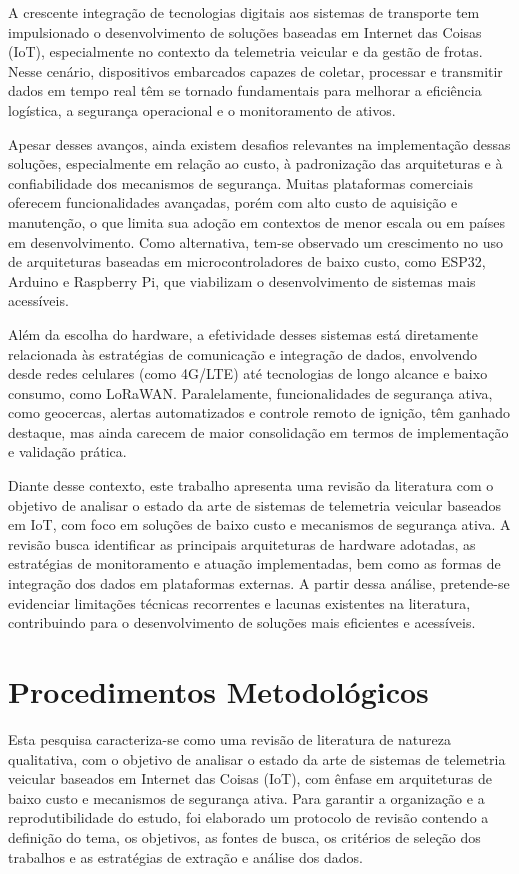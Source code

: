 \documentclass[
	article,			%
	11pt,				%
	oneside,			%
	a4paper,			%
	english,			%
	brazil,				%
	sumario=tradicional
	]{abntex2}
\begin{document}
A crescente integração de tecnologias digitais aos sistemas de transporte tem impulsionado o desenvolvimento de soluções baseadas em Internet das Coisas (IoT), especialmente no contexto da telemetria veicular e da gestão de frotas. Nesse cenário, dispositivos embarcados capazes de coletar, processar e transmitir dados em tempo real têm se tornado fundamentais para melhorar a eficiência logística, a segurança operacional e o monitoramento de ativos.

Apesar desses avanços, ainda existem desafios relevantes na implementação dessas soluções, especialmente em relação ao custo, à padronização das arquiteturas e à confiabilidade dos mecanismos de segurança. Muitas plataformas comerciais oferecem funcionalidades avançadas, porém com alto custo de aquisição e manutenção, o que limita sua adoção em contextos de menor escala ou em países em desenvolvimento. Como alternativa, tem-se observado um crescimento no uso de arquiteturas baseadas em microcontroladores de baixo custo, como ESP32, Arduino e Raspberry Pi, que viabilizam o desenvolvimento de sistemas mais acessíveis.

Além da escolha do hardware, a efetividade desses sistemas está diretamente relacionada às estratégias de comunicação e integração de dados, envolvendo desde redes celulares (como 4G/LTE) até tecnologias de longo alcance e baixo consumo, como LoRaWAN. Paralelamente, funcionalidades de segurança ativa, como geocercas, alertas automatizados e controle remoto de ignição, têm ganhado destaque, mas ainda carecem de maior consolidação em termos de implementação e validação prática.

Diante desse contexto, este trabalho apresenta uma revisão da literatura com o objetivo de analisar o estado da arte de sistemas de telemetria veicular baseados em IoT, com foco em soluções de baixo custo e mecanismos de segurança ativa. A revisão busca identificar as principais arquiteturas de hardware adotadas, as estratégias de monitoramento e atuação implementadas, bem como as formas de integração dos dados em plataformas externas. A partir dessa análise, pretende-se evidenciar limitações técnicas recorrentes e lacunas existentes na literatura, contribuindo para o desenvolvimento de soluções mais eficientes e acessíveis.

\section{Procedimentos Metodológicos}

Esta pesquisa caracteriza-se como uma revisão de literatura de natureza qualitativa, com o objetivo de analisar o estado da arte de sistemas de telemetria veicular baseados em Internet das Coisas (IoT), com ênfase em arquiteturas de baixo custo e mecanismos de segurança ativa. Para garantir a organização e a reprodutibilidade do estudo, foi elaborado um protocolo de revisão contendo a definição do tema, os objetivos, as fontes de busca, os critérios de seleção dos trabalhos e as estratégias de extração e análise dos dados.
\end{document}
